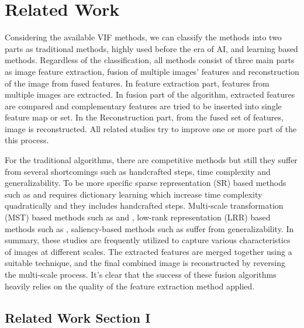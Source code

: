 \chapter{Related Work}
\label{chp:02bgwork}

Considering the available VIF methods, we can classify the methods into two parts as traditional methods, highly used before the era of AI, and learning based methods. Regardless of the classification, all methods consist of three main parts as image feature extraction, fusion of multiple images' features and reconstruction of the image from fused features. In feature extraction part, features from multiple images are extracted. In fusion part of the algorithm, extracted features are compared and complementary features are tried to be inserted into single feature map or set. In the Reconstruction part, from the fused set of features,  image is reconstructed.
All related studies try to improve one or more part of the this process.

For the traditional algorithms, there are competitive methods but still they suffer from several shortcomings such as handcrafted steps, time complexity and generalizability. To be more specific sparse representation (SR) based methods such as \cite{bin2016efficient} and \cite{zhang2013dictionary} requires dictionary learning which increase time complexity quadratically and they includes handcrafted steps. Multi-scale transformation (MST) based methods such as \cite{hu2017adaptive} and \cite{hu2017adaptive}, low-rank representation (LRR) based methods such as \cite[text]{liu2012robust}, saliency-based methods such as \cite[text]{liu2017infrared} suffer from generalizability. In summary, these studies are frequently utilized to capture various characteristics of images at different scales. The extracted features are merged together using a suitable technique, and the final combined image is reconstructed by reversing the multi-scale process. It's clear that the success of these fusion algorithms heavily relies on the quality of the feature extraction method applied.


\section{Related Work Section I}